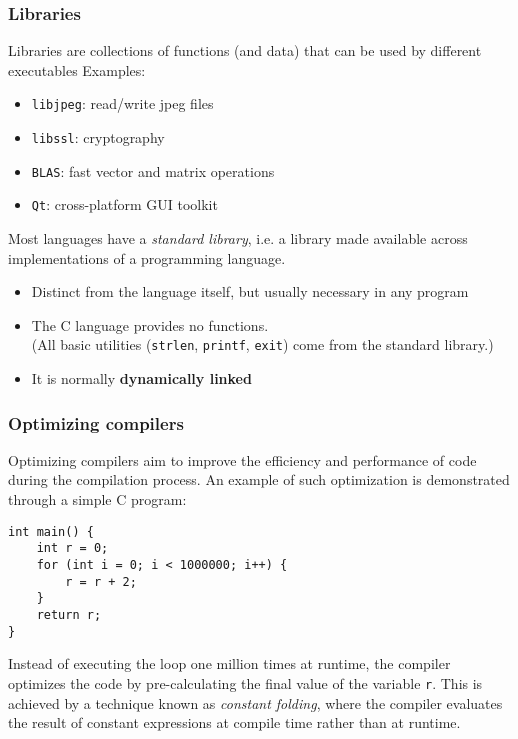 \documentclass[12pt]{article}
\begin{document}





\subsubsection{Libraries}

Libraries are collections of functions (and data) that can be used by different executables
Examples:
\begin{itemize}
    \item \texttt{libjpeg}: read/write jpeg files
    \item \texttt{libssl}: cryptography
    \item \texttt{BLAS}: fast vector and matrix operations
    \item \texttt{Qt}: cross-platform GUI toolkit
\end{itemize}

Most languages have a \textit{standard library},  i.e. a library made available across implementations of a programming language. 
\begin{itemize}
    \item Distinct from the language itself, but usually necessary in any program
    \item The C language provides no functions. \\
    (All basic utilities (\texttt{strlen}, \texttt{printf}, \texttt{exit}) come from the standard library.)
    \item It is normally \textbf{dynamically linked}
\end{itemize}

\subsubsection{Optimizing compilers}

Optimizing compilers aim to improve the efficiency and performance of code during the compilation process. An example of such optimization is demonstrated through a simple C program:
\begin{lstlisting}
int main() {
    int r = 0;
    for (int i = 0; i < 1000000; i++) {
        r = r + 2;
    }
    return r;
}
\end{lstlisting}

Instead of executing the loop one million times at runtime, the compiler optimizes the code by pre-calculating the final value of the variable \texttt{r}. This is achieved by a technique known as \textit{constant folding}, where the compiler evaluates the result of constant expressions at compile time rather than at runtime.
\end{document}
